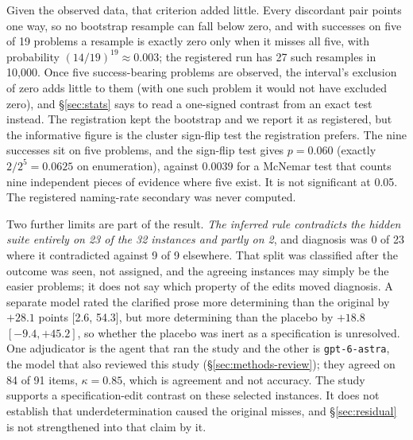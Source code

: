 Given the observed data, that criterion added little. Every discordant pair points one way, so no
bootstrap resample can fall below zero, and with successes on five of 19 problems a resample is
exactly zero only when it misses all five, with probability $(14/19)^{19} \approx 0.003$; the
registered run has 27 such resamples in 10{,}000. Once five success-bearing problems are observed,
the interval's exclusion of zero adds little to them (with one such problem it would not have
excluded zero), and \S\ref{sec:stats} says to read a one-signed contrast from an exact test
instead. The registration kept the bootstrap and we report it as registered, but the informative
figure is the cluster sign-flip test the registration prefers. The nine successes sit on five
problems, and the sign-flip test gives $p = 0.060$ (exactly $2/2^5 = 0.0625$ on enumeration), against $0.0039$ for
a McNemar test that counts nine independent pieces of evidence where five exist. It is not
significant at 0.05. The registered naming-rate secondary was never computed.

Two further limits are part of the result. \emph{The inferred rule contradicts the hidden suite
entirely on 23 of the 32 instances and partly on 2}, and diagnosis was 0 of 23 where it
contradicted against 9 of 9 elsewhere. That split was classified after the outcome was seen, not
assigned, and the agreeing instances may simply be the easier problems; it does not say which
property of the edits moved diagnosis. A separate model rated the clarified prose more
determining than the original by $+28.1$ points [2.6, 54.3], but more determining than the
placebo by $+18.8$ $[-9.4, +45.2]$, so whether the placebo was inert as a specification is unresolved. One
adjudicator is the agent that ran the study and the other is \texttt{gpt-6-astra}, the model that
also reviewed this study (\S\ref{sec:methods-review}); they agreed on 84 of 91 items,
$\kappa = 0.85$, which is agreement and not accuracy. The study supports a specification-edit
contrast on these selected instances. It does not establish that underdetermination caused the
original misses, and \S\ref{sec:residual} is not strengthened into that claim by it.

